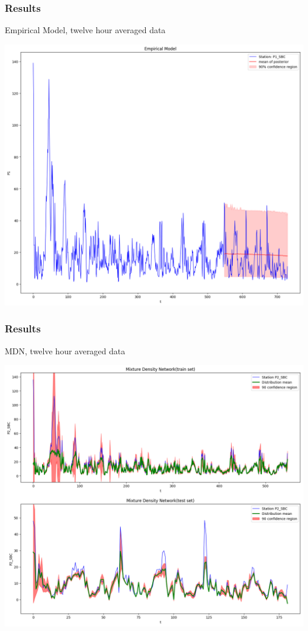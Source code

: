 \documentclass[18pt]{beamer}
\begin{document}
\begin{frame}[t]
  \frametitle{Results}
  Empirical Model, twelve hour averaged data
  \begin{center}
    \includegraphics[scale=0.25]{images/12h/emp-12h}
  \end{center}  
\end{frame}

\begin{frame}[t]
  \frametitle{Results}
  MDN, twelve hour averaged data
  \begin{center}
    \includegraphics[scale=0.25]{images/12h/mdn_12h}
  \end{center}  
\end{frame}
\end{document}
